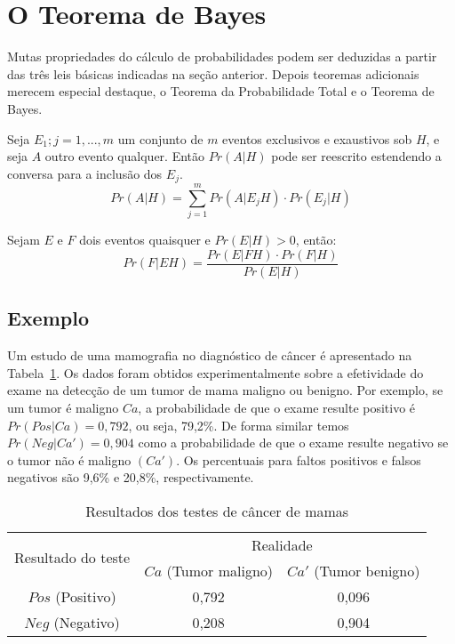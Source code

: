 \section{O Teorema de Bayes}

Mutas propriedades do cálculo de probabilidades podem ser deduzidas a partir das três leis básicas indicadas na seção anterior. Depois teoremas adicionais merecem especial destaque, o Teorema da Probabilidade Total e o Teorema de Bayes.

\begin{tcolorbox}[colback=blue!5,colframe=blue!75!black,title=Teorema da Probabilidade Total]
    Seja ${E_1; j=1, ..., m}$ um conjunto de $m$ eventos exclusivos e exaustivos sob $H$, e seja $A$ outro evento qualquer. Então $Pr(A|H)$ pode ser reescrito estendendo a conversa para a inclusão dos $E_j$.
    \begin{equation}
        Pr(A|H) = \sum_{j=1}^{m}{Pr(A|E_j H) \cdot Pr(E_j|H)}
    \end{equation}
\end{tcolorbox}

\begin{tcolorbox}[colback=blue!5,colframe=blue!75!black,title=Teorema de Bayes]
    Sejam $E$ e $F$ dois eventos quaisquer e $Pr(E|H)>0$, então:
    \begin{equation}
        Pr(F|E H) = \frac{Pr(E|F H) \cdot Pr(F|H)}{Pr(E|H)}
    \end{equation}
\end{tcolorbox}

\subsection{Exemplo}

Um estudo de uma mamografia no diagnóstico de câncer é apresentado na Tabela~\ref{tab:tab1}. Os dados foram obtidos experimentalmente sobre a efetividade do exame na detecção de um tumor de mama maligno ou benigno. Por exemplo, se um tumor é maligno $Ca$, a probabilidade de que o exame resulte positivo é $Pr(Pos | Ca) = 0,792$, ou seja, 79,2\%. De forma similar temos $Pr(Neg | Ca') = 0,904$ como a probabilidade de que o exame resulte negativo se o tumor não é maligno $(Ca')$. Os percentuais para faltos positivos e falsos negativos são 9,6\% e 20,8\%, respectivamente.

\begin{table}[h]
    \caption{Resultados dos testes de câncer de mamas}
    \label{tab:tab1}
    \center
    \begin{tabular}{ |c|c|c| } 
    \hline
    \multirow{2}{4em}{Resultado do teste} & \multicolumn{2}{|c|}{Realidade} \\
    & $Ca$ (Tumor maligno) & $Ca'$ (Tumor benigno) \\ 
    \hline
    $Pos$ (Positivo) & 0,792 & 0,096 \\ 
    $Neg$ (Negativo) & 0,208 & 0,904 \\ 
    \hline
    \end{tabular}
\end{table}

